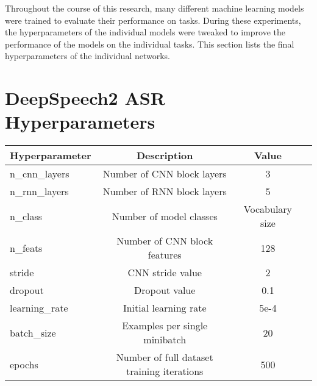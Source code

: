Throughout the course of this research, many different machine learning models were
trained to evaluate their performance on tasks. During these experiments,
the hyperparameters of the individual models were tweaked to improve the performance of
the models on the individual tasks. This section lists the final hyperparameters of
the individual networks.

\section{DeepSpeech2 ASR Hyperparameters}


{\small\begin{center}
\begin{tabular} { | l | c | c | c | }
\hline
Hyperparameter & Description & Value \\
\hline
n\_cnn\_layers & Number of CNN block layers & 3 \\
n\_rnn\_layers & Number of RNN block layers & 5 \\
n\_class & Number of model classes & Vocabulary size \\
n\_feats & Number of CNN block features & 128 \\
stride & CNN stride value & 2 \\
dropout & Dropout value & 0.1 \\
learning\_rate & Initial learning rate & 5e-4 \\
batch\_size & Examples per single minibatch & 20 \\
epochs & Number of full dataset training iterations & 500 \\
\hline
\end{tabular}
\end{center}}